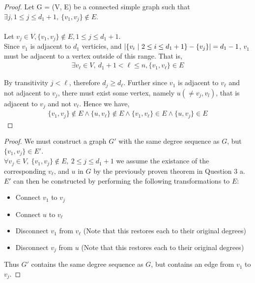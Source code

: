 \documentclass[12pt]{article}
\newenvironment{question}[2][Question]{\begin{trivlist}
\item[\hskip \labelsep {\bfseries #1}\hskip \labelsep {\bfseries #2.}]}{\end{trivlist}}
\DeclarePairedDelimiter\abs{\lvert}{\rvert}%
\begin{document}
\begin{question}{3 (a)}
  \leavevmode
  \begin{proof}
    Let G = (V, E) be a connected simple graph such that $\exists j, 1 \leq j \leq d_{1} + 1,\ \{v_{1}, v_{j}\} \notin E$. \\ \\
    Let $v_{j} \in V, \{v_{1}, v_{j}\} \notin E, 1 \leq j \leq d_{1} + 1$. \\
    Since $v_{1}$ is adjacent to $d_{1}$ verticies, and $\abs{\{v_{i}\ |\ 2 \leq i \leq d_{1} + 1\} - \{v_{j}\}} = d_{1} - 1$,
    $v_{1}$ must be adjacent to a vertex outside of this range.  That is,
    \begin{align*}
      \exists v_{\ell} \in V,\ d_{1} + 1 < \ell \leq n, \{v_{1}, v_{\ell}\} \in E
    \end{align*}

    By transitivity $j < \ell$, therefore $d_{j} \geq d_{\ell}$.  Further since
    $v_{1}$ is adjacent to $v_{\ell}$ and not adjacent to $v_{j}$,
    there must exist some vertex, namely $u (\neq v_{j}, v_{l})$, that is adjacent to $v_{j}$ and not
    $v_{\ell}$. Hence we have,
    \begin{align*}
      \{v_{1}, v_{j}\} \notin E \land \{u, v_{\ell}\} \notin E \land
      \{v_{1}, v_{\ell}\} \in E \land \{u, v_{j}\} \in E
    \end{align*}
  \end{proof}
\end{question}

\begin{question}{3 (b)}
  \leavevmode
  \begin{proof}
    We must construct a graph $G'$ with the same degree sequence as $G$, but
    $\{v_{1}, v_{j}\} \in E'$. \\

    $\forall v_{j} \in V,\ \{v_{1}, v_{j}\} \notin E,\ 2 \leq j \leq d_{1} + 1$
    we assume the existance of the corresponding $v_{\ell}$, and $u$ in $G$ by the previously
    proven theorem in Question 3 a. \\

    $E'$ can then be constructed by performing the following transformations to $E$:
    \begin{itemize}
      \item Connect $v_{1}$ to $v_{j}$
      \item Connect $u$ to $v_{\ell}$
      \item Disconnect $v_{1}$ from $v_{\ell}$ (Note that this restores each
        to their original degrees)
      \item Disconnect $v_{j}$ from $u$ (Note that this restores each to their
        original degrees)
    \end{itemize}
    Thus $G'$ contains the same degree sequence as $G$, but contains an edge
    from $v_{1}$ to $v_{j}$.
  \end{proof}
\end{question}
\end{document}
